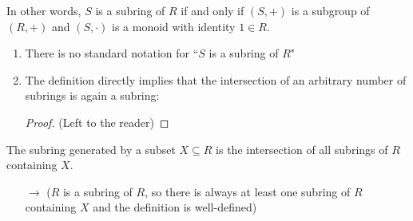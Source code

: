 \begin{remark}
    In other words, $S$ is a subring of $R$ if and only if $(S,+)$ is a subgroup of $(R,+)$ and $(S,\cdot)$ is a monoid with identity $1 \in R$.
\end{remark}

\begin{note}
    \leavevmode
    \begin{enumerate}
        \item There is no standard notation for ``$S$ is a subring of $R$"
        \item The definition directly implies that the intersection of an arbitrary number of subrings is again a subring:
        \begin{proof}
            (Left to the reader)
        \end{proof}
    \end{enumerate}
\end{note}

\begin{definition}
    The subring generated by a subset $X \subseteq R$ is the intersection of all subrings of $R$ containing $X$.
    \begin{enumerate}
        \item[$\rightarrow$] ($R$ is a subring of $R$, so there is always at least one subring of $R$ containing $X$ and the definition is well-defined)
    \end{enumerate}
\end{definition}

